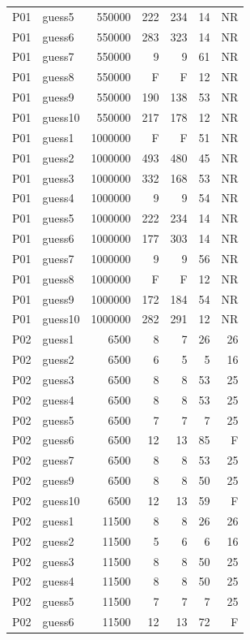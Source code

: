 {\begin{longtable}{llrrrrr}
P01 & guess5 & 550000 & 222 & 234 & 14 & NR \\
P01 & guess6 & 550000 & 283 & 323 & 14 & NR \\
P01 & guess7 & 550000 & 9 & 9 & 61 & NR \\
P01 & guess8 & 550000 & F & F & 12 & NR \\
P01 & guess9 & 550000 & 190 & 138 & 53 & NR \\
P01 & guess10 & 550000 & 217 & 178 & 12 & NR \\
P01 & guess1 & 1000000 & F & F & 51 & NR \\
P01 & guess2 & 1000000 & 493 & 480 & 45 & NR \\
P01 & guess3 & 1000000 & 332 & 168 & 53 & NR \\
P01 & guess4 & 1000000 & 9 & 9 & 54 & NR \\
P01 & guess5 & 1000000 & 222 & 234 & 14 & NR \\
P01 & guess6 & 1000000 & 177 & 303 & 14 & NR \\
P01 & guess7 & 1000000 & 9 & 9 & 56 & NR \\
P01 & guess8 & 1000000 & F & F & 12 & NR \\
P01 & guess9 & 1000000 & 172 & 184 & 54 & NR \\
P01 & guess10 & 1000000 & 282 & 291 & 12 & NR \\
P02 & guess1 & 6500 & 8 & 7 & 26 & 26 \\
P02 & guess2 & 6500 & 6 & 5 & 5 & 16 \\
P02 & guess3 & 6500 & 8 & 8 & 53 & 25 \\
P02 & guess4 & 6500 & 8 & 8 & 53 & 25 \\
P02 & guess5 & 6500 & 7 & 7 & 7 & 25 \\
P02 & guess6 & 6500 & 12 & 13 & 85 & F \\
P02 & guess7 & 6500 & 8 & 8 & 53 & 25 \\
P02 & guess9 & 6500 & 8 & 8 & 50 & 25 \\
P02 & guess10 & 6500 & 12 & 13 & 59 & F \\
P02 & guess1 & 11500 & 8 & 8 & 26 & 26 \\
P02 & guess2 & 11500 & 5 & 6 & 6 & 16 \\
P02 & guess3 & 11500 & 8 & 8 & 50 & 25 \\
P02 & guess4 & 11500 & 8 & 8 & 50 & 25 \\
P02 & guess5 & 11500 & 7 & 7 & 7 & 25 \\
P02 & guess6 & 11500 & 12 & 13 & 72 & F \\

\end{longtable}}

